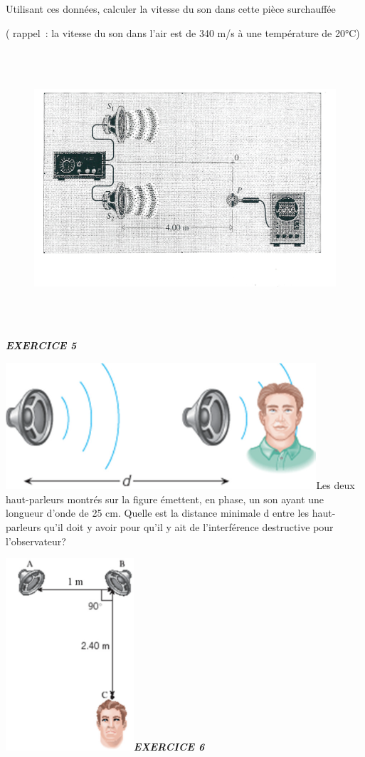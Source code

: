 Utilisant ces données, calculer la vitesse du son dans cette pièce
surchauffée

( rappel~: la vitesse du son dans l'air est de 340 m/s à une température
de 20°C)

\begin{figure}
\centering
\includegraphics[width=15.663cm,height=10.231cm]{Pictures/100000010000062500000404B4675BF2C4CE1EEC.png}
\caption{}
\end{figure}

\emph{\textbf{EXERCICE 5}}

\includegraphics[width=11.546cm,height=4.688cm]{Pictures/1000000100000363000001603D3E7105AB252F90.png}Les
deux haut-parleurs montrés sur la figure émettent, en phase, un son
ayant une longueur d'onde de 25 cm. Quelle est la distance minimale d
entre les haut-parleurs qu'il doit y avoir pour qu'il y ait de
l'interférence destructive pour l'observateur?

\includegraphics[width=4.757cm,height=7.147cm]{Pictures/10000001000001BA00000298E2F6E319C348E061.png}\emph{\textbf{EXERCICE
6}}

